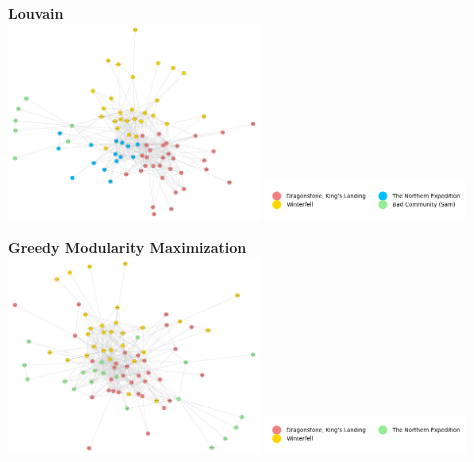 \documentclass[10pt,twocolumn,letterpaper]{article}
\begin{document}
\begin{center}
    \textbf{Louvain} \\
    \includegraphics[width=0.5\textwidth]{img/s7/communities_louvain.jpg}
    \includegraphics[width=0.4\textwidth]{img/s7/louvain_legend.jpg}\\
    \caption{\small{$\#communities=4$, $modularity=0.32$}}
\end{center}

\begin{center}
    \textbf{Greedy Modularity Maximization}\\
    \includegraphics[width=0.5\textwidth]{img/s7/communities_gmm.jpg}
    \includegraphics[width=0.4\textwidth]{img/s7/gmm_legend.jpg}\\
    \caption{\small{$\#communities=3$, $modularity=0.31$}}
\end{center}
\end{document}
